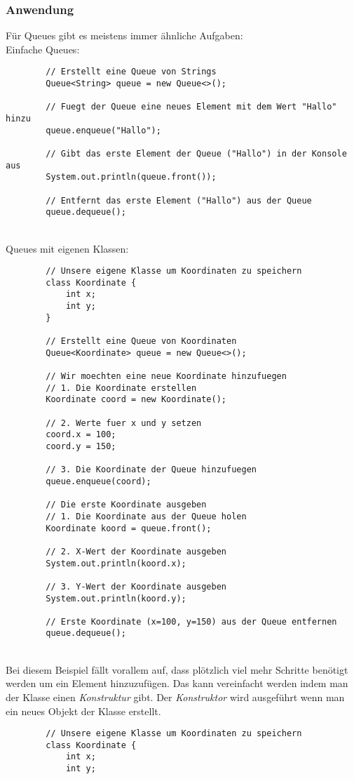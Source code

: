 \subsubsection{Anwendung}
\begin{flushleft}
    Für Queues gibt es meistens immer ähnliche Aufgaben: \\
    Einfache Queues:
    \begin{lstlisting}
        // Erstellt eine Queue von Strings
        Queue<String> queue = new Queue<>();
        
        // Fuegt der Queue eine neues Element mit dem Wert "Hallo" hinzu
        queue.enqueue("Hallo");

        // Gibt das erste Element der Queue ("Hallo") in der Konsole aus
        System.out.println(queue.front());

        // Entfernt das erste Element ("Hallo") aus der Queue
        queue.dequeue();
    \end{lstlisting}
     \\
    Queues mit eigenen Klassen:
    \begin{lstlisting}
        // Unsere eigene Klasse um Koordinaten zu speichern
        class Koordinate {
            int x;
            int y;
        }
        
        // Erstellt eine Queue von Koordinaten
        Queue<Koordinate> queue = new Queue<>();
        
        // Wir moechten eine neue Koordinate hinzufuegen
        // 1. Die Koordinate erstellen
        Koordinate coord = new Koordinate();
        
        // 2. Werte fuer x und y setzen
        coord.x = 100;
        coord.y = 150;

        // 3. Die Koordinate der Queue hinzufuegen
        queue.enqueue(coord);
    
        // Die erste Koordinate ausgeben
        // 1. Die Koordinate aus der Queue holen
        Koordinate koord = queue.front();

        // 2. X-Wert der Koordinate ausgeben
        System.out.println(koord.x);
        
        // 3. Y-Wert der Koordinate ausgeben
        System.out.println(koord.y);

        // Erste Koordinate (x=100, y=150) aus der Queue entfernen
        queue.dequeue();
    \end{lstlisting}
     \\
    Bei diesem Beispiel fällt vorallem auf, dass plötzlich viel mehr Schritte benötigt werden um ein Element hinzuzufügen.
    Das kann vereinfacht werden indem man der Klasse einen \textit{Konstruktur} gibt.
    Der \textit{Konstruktor} wird ausgeführt wenn man ein neues Objekt der Klasse erstellt.
    \begin{lstlisting}
        // Unsere eigene Klasse um Koordinaten zu speichern
        class Koordinate {
            int x;
            int y;
            

\end{lstlisting}
\end{flushleft}
